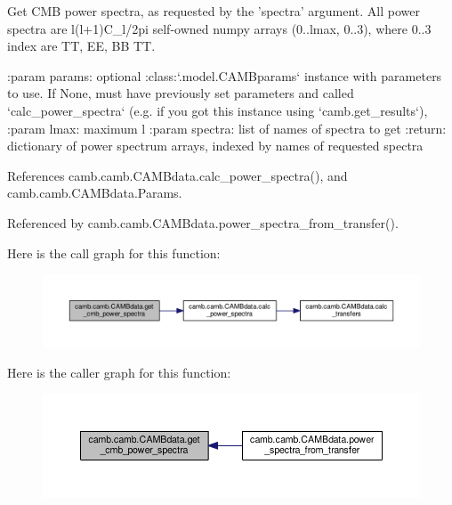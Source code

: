 \begin{DoxyVerb}Get CMB power spectra, as requested by the 'spectra' argument. All power spectra are l(l+1)C_l/2pi self-owned
numpy arrays (0..lmax, 0..3), where 0..3 index are TT, EE, BB TT.

:param params: optional :class:`.model.CAMBparams` instance with parameters to use. If None, must have
  previously set parameters and called `calc_power_spectra` (e.g. if you got this instance using `camb.get_results`),
:param lmax: maximum l
:param spectra: list of names of spectra to get
:return: dictionary of power spectrum arrays, indexed by names of requested spectra
\end{DoxyVerb}
 

References camb.\+camb.\+C\+A\+M\+Bdata.\+calc\+\_\+power\+\_\+spectra(), and camb.\+camb.\+C\+A\+M\+Bdata.\+Params.



Referenced by camb.\+camb.\+C\+A\+M\+Bdata.\+power\+\_\+spectra\+\_\+from\+\_\+transfer().

Here is the call graph for this function\+:
\nopagebreak
\begin{figure}[H]
\begin{center}
\leavevmode
\includegraphics[width=350pt]{classcamb_1_1camb_1_1CAMBdata_a59d6f78493417bf69c40475e4c9a697f_cgraph}
\end{center}
\end{figure}
Here is the caller graph for this function\+:
\nopagebreak
\begin{figure}[H]
\begin{center}
\leavevmode
\includegraphics[width=350pt]{classcamb_1_1camb_1_1CAMBdata_a59d6f78493417bf69c40475e4c9a697f_icgraph}
\end{center}
\end{figure}
\mbox{\label{classcamb_1_1camb_1_1CAMBdata_a5065605556b12be1125fa51140eb745f}} 
